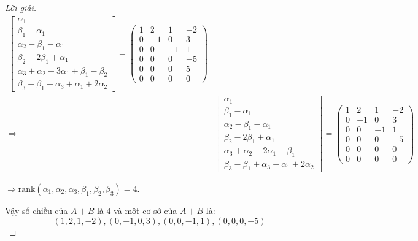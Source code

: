 \documentclass[class=linearalgebra,crop=false]{standalone}
\begin{document}
\begin{proof}[Lời giải]
\begin{align*}
\begin{bmatrix}
            \alpha_{1} \\
            \beta_{1} - \alpha_{1} \\
            \alpha_{2} - \beta_{1} - \alpha_{1} \\
            \beta_{2} - 2\beta_{1} + \alpha_{1} \\
            \alpha_{3} + \alpha_{2} - 3\alpha_{1} + \beta_{1} - \beta_{2} \\
            \beta_{3} - \beta_{1} + \alpha_{3} + \alpha_{1} + 2\alpha_{2}
        \end{bmatrix}=
        \begin{pmatrix}
            1 & 2 & 1 & -2 \\
            0 & -1 & 0 & 3 \\
            0 & 0 & -1 & 1 \\
            0 & 0 & 0 & -5 \\
            0 & 0 & 0 & 5 \\
            0 & 0 & 0 & 0
        \end{pmatrix} \\
        \Longrightarrow&
        \begin{bmatrix}
            \alpha_{1} \\
            \beta_{1} - \alpha_{1} \\
            \alpha_{2} - \beta_{1} - \alpha_{1} \\
            \beta_{2} - 2\beta_{1} + \alpha_{1} \\
            \alpha_{3} + \alpha_{2} - 2\alpha_{1} - \beta_{1}  \\
            \beta_{3} - \beta_{1} + \alpha_{3} + \alpha_{1} + 2\alpha_{2}
        \end{bmatrix}=
        \begin{pmatrix}
            1 & 2 & 1 & -2 \\
            0 & -1 & 0 & 3 \\
            0 & 0 & -1 & 1 \\
            0 & 0 & 0 & -5 \\
            0 & 0 & 0 & 0 \\
            0 & 0 & 0 & 0
        \end{pmatrix}
    \end{align*}
    \par $\Rightarrow\text{rank}(\alpha_{1},\alpha_{2},\alpha_{3},\beta_{1},\beta_{2},\beta_{3}) = 4$.
    \par Vậy số chiều của $A + B$ là $4$ và một cơ sở của $A + B$ là:
        \[ (1, 2, 1, -2), (0, -1, 0, 3), (0, 0, -1, 1), (0, 0, 0, -5) \]

\end{proof}
\end{document}
